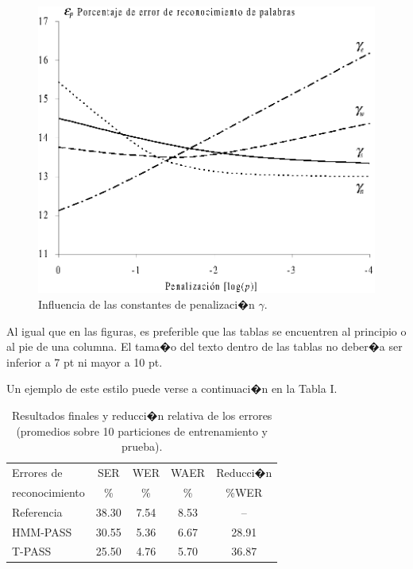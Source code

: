 \documentclass[conference,a4paper,10pt,oneside,final]{tfmpd}
\begin{document}
\begin{figure}[tbhp]
\centerline{\includegraphics[scale=0.75]{gammas}}
\caption{Influencia de las constantes de penalizaci�n $\gamma$.}
\label{fig2}
\end{figure}

Al igual que en las figuras, es preferible que las tablas se encuentren al principio o al pie de una columna. El tama�o del texto dentro de las tablas no deber�a ser inferior a 7 pt ni mayor a 10 pt.

Un ejemplo de este estilo puede verse a continuaci�n en la Tabla I.

\begin{table}[htbp]
\caption{Resultados finales y reducci�n relativa de los errores (promedios sobre 10 
particiones de entrenamiento y prueba).}
\begin{center}
\begin{tabular}{l|c|c|c|c}
\hline
Errores de     & SER    & WER  & WAER & Reducci�n \\
reconocimiento & {\%}   & {\%} & {\%} & {\%}WER   \\
\hline
Referencia& 38.30& 7.54& 8.53&    -- \\
HMM-PASS  & 30.55& 5.36& 6.67& 28.91 \\
T-PASS    & 25.50& 4.76& 5.70& 36.87 \\
\hline
\end{tabular}
\end{center}
\label{tab1}
\end{table}
\end{document}
